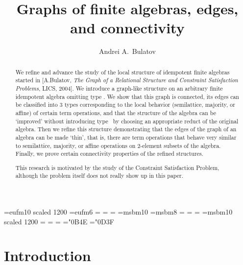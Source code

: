 \documentclass[11pt]{article}
\begin{document}
\def\lb{}  
  
\def\ar{\hbox{ar}} 
\def\Im{{\sf Im}\;} 
\def\deg{{\sf deg}}
\def\id{{\rm id}}
  
\let\al=\alpha 
\let\gm=\gamma 
\let\dl=\delta 
\let\ve=\varepsilon
\let\ld=\lambda 
\let\om=\omega 
\let\vf=\varphi 
\let\vr=\varrho
\let\th=\theta 
\let\sg=\sigma 
\let\Gm=\Gamma 
\let\Dl=\Delta
  


\font\tengoth=eufm10 scaled 1200 
\font\sixgoth=eufm6
\def\goth{\fam12} 
=\tengoth 
{}=\sixgoth
{}=\sixgoth 
\font\tenbur=msbm10
\font\eightbur=msbm8 
\def\bur{\fam13} 
=\tenbur
{}=\eightbur 
{}=\eightbur
\font\twelvebur=msbm10 scaled 1200 
=\twelvebur
{}=\tenbur 
{}=\eightbur
\mathchardef\nat="0B4E 
\mathchardef\eps="0D3F
  
  
\title{Graphs of finite algebras, edges, and connectivity}
\author{Andrei A.\ Bulatov\\ 
} 
\date{} 
\maketitle
\begin{abstract}
We refine and advance the study of the local structure of idempotent finite algebras started
in [A.Bulatov, \emph{The Graph of a Relational Structure and Constraint Satisfaction Problems}, LICS, 2004]. We introduce a 
graph-like structure on an arbitrary finite idempotent algebra omitting type \one. We
show that this graph is connected, its edges can be classified into 3 types corresponding to
the local behavior (semilattice, majority, or affine) of certain term operations, and that
the structure of the algebra can be `improved' without introducing type \one\ by choosing
an appropriate reduct of the original algebra. Then we refine this structure demonstrating 
that the edges of the graph of an algebra can be made `thin', that is, there are term 
operations that behave very similar to semilattice, majority, or affine operations on 
2-element subsets of the algebra. Finally, we prove certain connectivity properties of the refined
structures.

This research is motivated by the study of the Constraint Satisfaction Problem, although
the problem itself does not really show up in this paper.
\end{abstract}

\section{Introduction}\label{sec:introduction}
\end{document}
